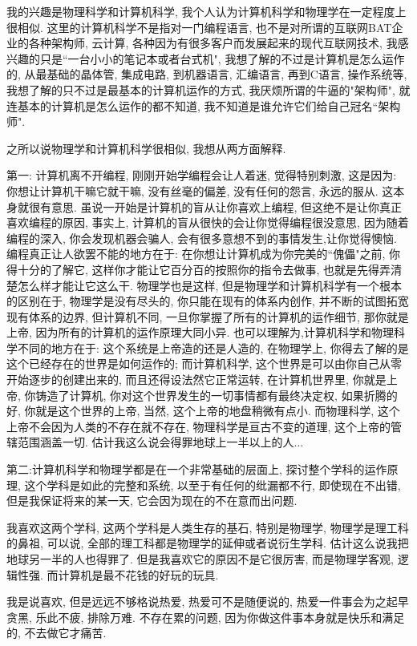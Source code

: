 \documentclass[utf8]{book}
\begin{document}
	我的兴趣是物理科学和计算机科学, 我个人认为计算机科学和物理学在一定程度上很相似. 这里的计算机科学不是指对一门编程语言, 也不是对所谓的互联网BAT企业的各种架构师, 云计算, 各种因为有很多客户而发展起来的现代互联网技术, 我感兴趣的只是``一台小小的笔记本或者台式机", 我想了解的不过是计算机是怎么运作的, 从最基础的晶体管, 集成电路, 到机器语言, 汇编语言, 再到C语言, 操作系统等, 我想了解的只不过是最基本的计算机运作的方式, 我厌烦所谓的牛逼的"架构师", 就连基本的计算机是怎么运作的都不知道, 我不知道是谁允许它们给自己冠名``架构师".

	之所以说物理学和计算机科学很相似, 我想从两方面解释. 

	第一: 计算机离不开编程, 刚刚开始学编程会让人着迷, 觉得特别刺激, 这是因为: 你想让计算机干嘛它就干嘛, 没有丝毫的偏差, 没有任何的怨言, 永远的服从. 这本身就很有意思. 虽说一开始是计算机的盲从让你喜欢上编程, 但这绝不是让你真正喜欢编程的原因, 事实上, 计算机的盲从很快的会让你觉得编程很没意思, 因为随着编程的深入, 你会发现机器会骗人, 会有很多意想不到的事情发生,让你觉得懊恼. 编程真正让人欲罢不能的地方在于: 在你想让计算机成为你完美的``傀儡"之前, 你得十分的了解它, 这样你才能让它百分百的按照你的指令去做事, 也就是先得弄清楚怎么样才能让它这么干. 物理学也是这样, 但是物理学和计算机科学有一个根本的区别在于, 物理学是没有尽头的, 你只能在现有的体系内创作, 并不断的试图拓宽现有体系的边界, 但计算机不同, 一旦你掌握了所有的计算机的运作细节, 那你就是上帝, 因为所有的计算机的运作原理大同小异. 也可以理解为,计算机科学和物理科学不同的地方在于: 这个系统是上帝造的还是人造的, 在物理学上, 你得去了解的是这个已经存在的世界是如何运作的; 而计算机科学, 这个世界是可以由你自己从零开始逐步的创建出来的, 而且还得设法然它正常运转, 在计算机世界里, 你就是上帝, 你铸造了计算机, 你对这个世界发生的一切事情都有最终决定权, 如果折腾的好, 你就是这个世界的上帝, 当然, 这个上帝的地盘稍微有点小. 而物理科学, 这个上帝不会因为人类的不存在就不存在, 物理科学是亘古不变的道理, 这个上帝的管辖范围涵盖一切.
	估计我这么说会得罪地球上一半以上的人...
	
	第二:计算机科学和物理学都是在一个非常基础的层面上, 探讨整个学科的运作原理, 这个学科是如此的完整和系统, 以至于有任何的纰漏都不行, 即使现在不出错, 但是我保证将来的某一天, 它会因为现在的不在意而出问题. 

	我喜欢这两个学科, 这两个学科是人类生存的基石, 特别是物理学, 物理学是理工科的鼻祖, 可以说, 全部的理工科都是物理学的延伸或者说衍生学科. 估计这么说我把地球另一半的人也得罪了. 但是我喜欢它的原因不是它很厉害, 而是物理学客观, 逻辑性强. 而计算机是最不花钱的好玩的玩具.
	
	我是说喜欢, 但是远远不够格说热爱, 热爱可不是随便说的, 热爱一件事会为之起早贪黑, 乐此不疲, 排除万难. 不存在累的问题, 因为你做这件事本身就是快乐和满足的, 不去做它才痛苦. 
	
\end{document}

